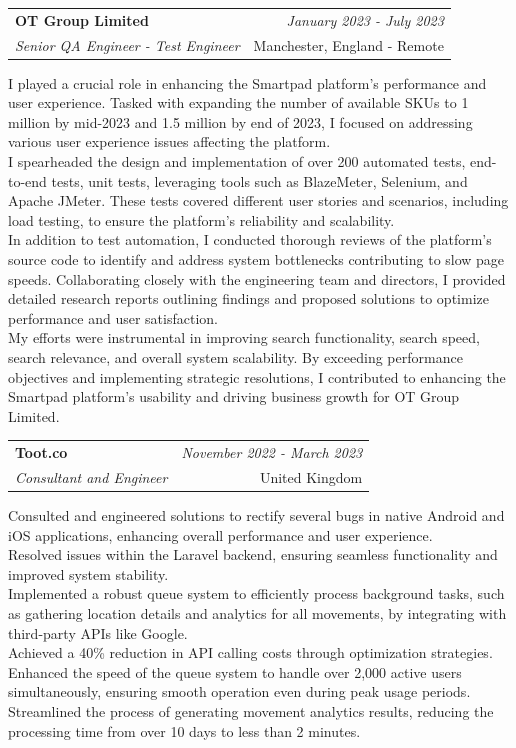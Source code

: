 \documentclass[a4paper,10pt]{article}
\makeatletter
\newcommand{\resumeSubheading}[4]{
	\vspace{0.5mm}\item
	\begin{tabular*}{0.98\textwidth}[t]{l@{\extracolsep{\fill}}r}
		\textbf{#1} & \textit{\footnotesize{#4}} \\
		\textit{\footnotesize{#3}} &  \footnotesize{#2}\\
	\end{tabular*}
	\vspace{-2.4mm}
}
\newcommand{\resumeItemListStart}{\begin{justify}\begin{itemize}[leftmargin=3ex, rightmargin=2ex, noitemsep,labelsep=1.2mm,itemsep=0mm]\small}
\newcommand{\resumeItemListEnd}{\end{itemize}\end{justify}\vspace{-2mm}}
\makeatother
\begin{document}
\vspace{-1mm}
\resumeSubheading
{OT Group Limited}{Manchester, England - Remote}
{Senior QA Engineer - Test Engineer}{January 2023 - July 2023}
\resumeItemListStart
I played a crucial role in enhancing the Smartpad platform's performance and user experience. Tasked with expanding the number of available SKUs to 1 million by mid-2023 and 1.5 million by end of 2023, I focused on addressing various user experience issues affecting the platform.\\
I spearheaded the design and implementation of over 200 automated tests, end-to-end tests, unit tests, leveraging tools such as BlazeMeter, Selenium, and Apache JMeter. These tests covered different user stories and scenarios, including load testing, to ensure the platform's reliability and scalability.\\
In addition to test automation, I conducted thorough reviews of the platform's source code to identify and address system bottlenecks contributing to slow page speeds. Collaborating closely with the engineering team and directors, I provided detailed research reports outlining findings and proposed solutions to optimize performance and user satisfaction.\\
My efforts were instrumental in improving search functionality, search speed, search relevance, and overall system scalability. By exceeding performance objectives and implementing strategic resolutions, I contributed to enhancing the Smartpad platform's usability and driving business growth for OT Group Limited.
\resumeItemListEnd

\vspace{-1mm}
\resumeSubheading
{Toot.co}{United Kingdom}
{Consultant and Engineer}{November 2022 - March 2023}
\resumeItemListStart
Consulted and engineered solutions to rectify several bugs in native Android and iOS applications, enhancing overall performance and user experience. \\
Resolved issues within the Laravel backend, ensuring seamless functionality and improved system stability. \\
Implemented a robust queue system to efficiently process background tasks, such as gathering location details and analytics for all movements, by integrating with third-party APIs like Google. \\
Achieved a 40\% reduction in API calling costs through optimization strategies. \\
Enhanced the speed of the queue system to handle over 2,000 active users simultaneously, ensuring smooth operation even during peak usage periods. \\
Streamlined the process of generating movement analytics results, reducing the processing time from over 10 days to less than 2 minutes.
\resumeItemListEnd
\end{document}
